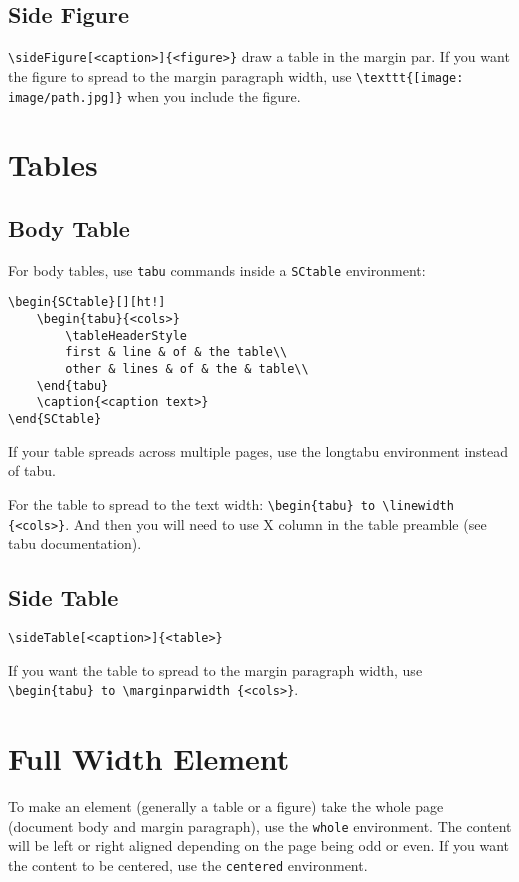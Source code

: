 \documentclass[a4paper, 11pt, oneside, fleqn]{article}
\begin{document}
	\subsection{Side Figure}
	\lstinline[breaklines]|\sideFigure[<caption>]{<figure>}| draw a table in the margin par. If you want the figure to spread to the margin paragraph width, use \lstinline[breaklines]|\texttt{[image: image/path.jpg]}| when you include the figure.
	
	
	\section{Tables}
	\subsection{Body Table}
	For body tables, use \lstinline[breaklines]|tabu| commands inside a \lstinline[breaklines]|SCtable| environment:
	\begin{lstlisting}
\begin{SCtable}[][ht!]
	\begin{tabu}{<cols>}
		\tableHeaderStyle
		first & line & of & the table\\
		other & lines & of & the & table\\
	\end{tabu}
	\caption{<caption text>}
\end{SCtable}
	\end{lstlisting}
	If your table spreads across multiple pages, use the longtabu environment instead of tabu.
	
	For the table to spread to the text width: \lstinline[breaklines]|\begin{tabu} to \linewidth {<cols>}|. And then you will need to use X column in the table preamble (see tabu documentation).
	
	\subsection{Side Table}
	\lstinline[breaklines]|\sideTable[<caption>]{<table>}|
	
	If you want the table to spread to the margin paragraph width, use \lstinline[breaklines]|\begin{tabu} to \marginparwidth {<cols>}|.
	
	\section{Full Width Element}
	To make an element (generally a table or a figure) take the whole page (document body and margin paragraph), use the \lstinline[breaklines]|whole| environment. The content will be left or right aligned depending on the page being odd or even. If you want the content to be centered, use the \lstinline[breaklines]|centered| environment.
	
\end{document}
